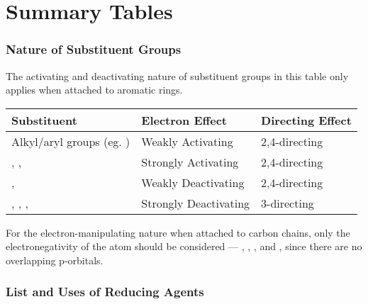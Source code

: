 
\pagebreak
\hypertarget{AppendixSummaryTables}{}
\part{Summary Tables}

	\section{Nature of Substituent Groups}

		The activating and deactivating nature of substituent groups in this table only applies when attached to aromatic rings.

		\begin{center}\begin{table}[htb]\renewcommand{\arraystretch}{1.5}
		\begin{tabu} to \textwidth {| X[-4,c,m] | X[c,m] | X[c,m] |}

			\hline
						Substituent						&	Electron Effect			&	Directing Effect	\\	\hline
			Alkyl/aryl groups (eg. )			&	Weakly Activating		&	2,4-directing		\\	\hline
			, , 				&	Strongly Activating		&	2,4-directing		\\	\hline
			\ch{-\Cl}, 					&	Weakly Deactivating		&	2,4-directing		\\	\hline
			, , , 	&	Strongly Deactivating	&	3-directing			\\	\hline

		\end{tabu}
		\end{table}\end{center}\vspace{-10mm}



		For the electron-manipulating nature when attached to carbon chains, only the electronegativity of the atom should
		be considered --- , , , and \ch{\Cl}, since there are no overlapping p-orbitals.





	\hypertarget{AppendixReducingAgents}{}
	\section{List and Uses of Reducing Agents}

